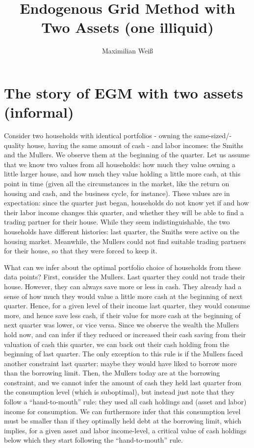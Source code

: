 \documentclass[11pt]{article} %
\title{Endogenous Grid Method with Two Assets (one illiquid)}
\author{Maximilian Weiß}
\begin{document}
\maketitle

\section{The story of EGM with two assets (informal)}\label{sec:story}

Consider two households with identical portfolios - owning the same-sized/-quality house, having the same amount of cash - and labor incomes:
the Smiths and the Mullers. We observe them at the beginning of the quarter. Let us assume that we know two values from all households: how much they value owning a little larger house, and how much they value holding a little more cash, at this point in time
(given all the circumstances in the market, like the return on housing and cash, and the business cycle, for instance).
These values are in expectation: since the quarter just began, households do not know yet if and how their labor income changes this quarter,
and whether they will be able to find a trading partner for their house.
While they seem indistinguishable, the two households have different histories: last quarter, the Smiths were active on the housing
market. Meanwhile, the Mullers could not find suitable trading partners for their house, so that they were forced to keep it.

What can we infer about the optimal portfolio choice of households from these data points? First, consider the Mullers.
Last quarter they could not trade their house. However, they can always save more or less in cash. They already had a sense
of how much they would value a little more cash at the beginning of next quarter. Hence, for a given level of their income last quarter, they would
consume more, and hence save less cash, if their value for more cash at the beginning of next quarter was lower, or vice versa.
Since we observe the wealth the Mullers hold now, and can infer if they reduced or increased their cash saving from their valuation
of cash this quarter, we can back out their cash holding from the beginning of last quarter. The only exception to this rule is if the
Mullers faced another constraint last quarter: maybe they would have liked to borrow more than the borrowing limit. Then, the Mullers today
are at the borrowing constraint, and we cannot infer the amount of cash they held last quarter from the consumption level (which is
suboptimal), but instead just note that they follow a ``hand-to-mouth'' rule: they used all cash holdings and (asset and labor) income for consumption. We can furthermore infer that this consumption level must be smaller than if they optimally held debt at the borrowing limit, which implies, for a given asset and labor income-level, a critical value of cash holdings below which they start following the ``hand-to-mouth'' rule.
\end{document}
